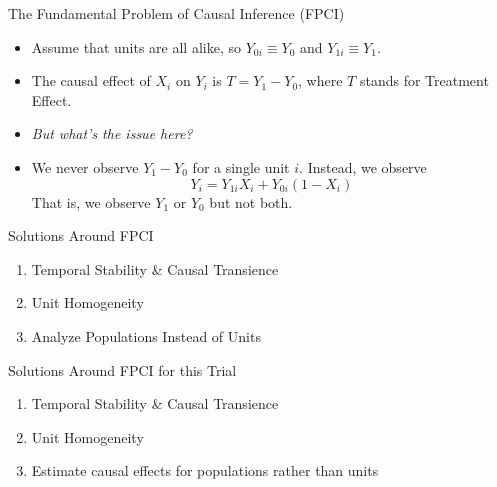 \documentclass{beamer}
\begin{document}
\begin{frame}{The Fundamental Problem of Causal Inference (FPCI)}
  \begin{itemize}
    \item<+-> Assume that units are all alike, so $Y_{0 i} \equiv Y_0$ and $Y_{1 i} \equiv Y_1$.
    \item<+-> The causal effect of $X_i$ on $Y_i$ is $T=Y_1-Y_0$, where $T$ stands for Treatment Effect.
    \item<+-> \textit{But what's the issue here?}
    \item<+-> We never observe $Y_1-Y_0$ for a single unit $i$. Instead, we observe
    $$
    Y_i=Y_{1 i} X_i+Y_{0 i}\left(1-X_i\right)
    $$
    That is, we observe $Y_1$ or $Y_0$ but not both.
  \end{itemize}
\end{frame}

\begin{frame}{Solutions Around FPCI}
  \begin{enumerate}
    \item<+-> Temporal Stability \& Causal Transience
    \item<+-> Unit Homogeneity
    \item<+-> Analyze Populations Instead of Units
  \end{enumerate}
\end{frame}

\begin{frame}{Solutions Around FPCI for this Trial}
  \begin{enumerate}
    \item Temporal Stability \& Causal Transience {\color{red}{X}}
    \item Unit Homogeneity {\color{red}{X}}
    \item Estimate causal effects for populations rather than units {\color{green}{\checkmark}}
  \end{enumerate}
\end{frame}
\end{document}
